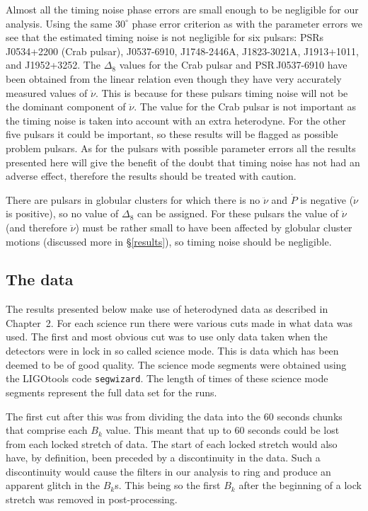 Almost all the timing noise phase errors are small enough to be negligible for our analysis.
Using the same $30^{\circ}$ phase error criterion as with the parameter errors we see that the
estimated timing noise is not negligible for six pulsars: PSRs\,J0534+2200 (Crab pulsar),
J0537-6910, J1748-2446A, J1823-3021A, J1913+1011, and J1952+3252. The $\Delta_8$ values for the Crab
pulsar and PSR\,J0537-6910 have been obtained from the linear relation even though they have very
accurately measured values of $\ddot{\nu}$. This is because for these pulsars timing noise will not
be the dominant component of $\ddot{\nu}$. The value for the Crab pulsar is not important as the
timing noise is taken into account with an extra heterodyne. For the other five pulsars it could be
important, so these results will be flagged as possible problem pulsars. As for the pulsars with
possible parameter errors all the results presented here will give the benefit of the doubt that
timing noise has not had an adverse effect, therefore the results should be treated with caution.

There are pulsars in globular clusters for which there is no $\ddot{\nu}$ and $\dot{P}$ is negative
($\dot{\nu}$ is positive), so no value of $\Delta_8$ can be assigned. For these pulsars the value of
$\dot{\nu}$ (and therefore $\ddot{\nu}$) must be rather small to have been affected by globular
cluster motions (discussed more in \S\ref{results}), so timing noise should be negligible.

\subsection{The data}
The results presented below make use of heterodyned data as described in Chapter~2. For each
science run there were various cuts made in what data was used. The first and most obvious cut was
to use only data taken when the detectors were in lock in so called science mode. This is data
which has been deemed to be of good quality. The science mode segments were obtained using the
LIGOtools \cite{LIGOtools} code {\tt segwizard}. The length of times of these science mode segments
represent the full data set for the runs.

The first cut after this was from dividing the data into the 60 seconds chunks that comprise each
$B_k$ value. This meant that up to 60 seconds could be lost from each locked stretch of data. The
start of each locked stretch would also have, by definition, been preceded by a discontinuity in
the data. Such a discontinuity would cause the filters in our analysis to ring and produce an
apparent glitch in the $B_k$s. This being so the first $B_k$ after the beginning of a lock
stretch was removed in post-processing. 

